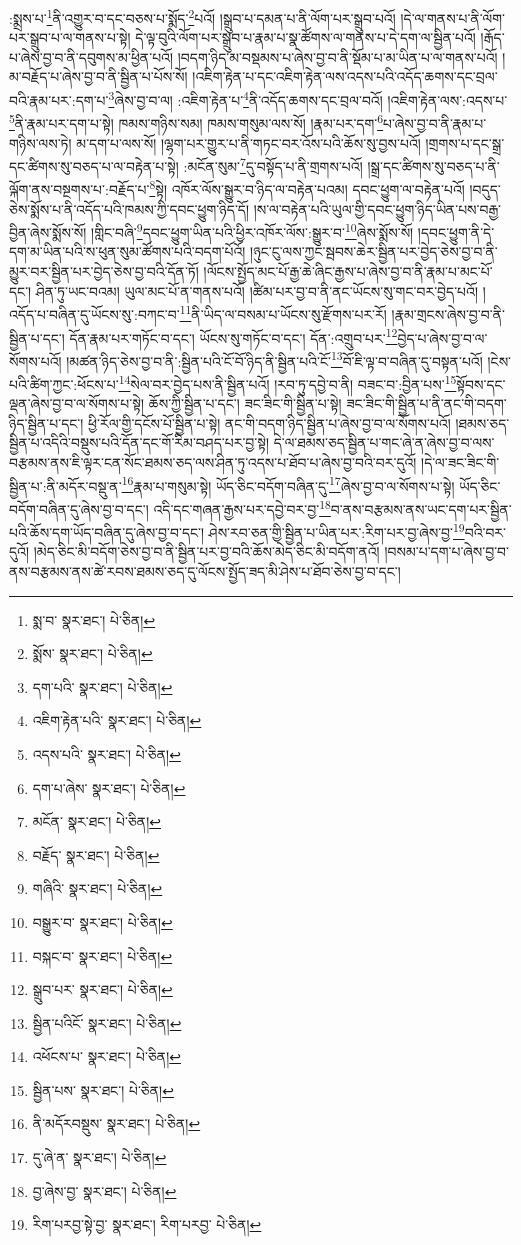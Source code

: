 :སྨྲས་པ་\footnote{སྨ་བ་  སྣར་ཐང་།  པེ་ཅིན། }ནི་འགྱུར་བ་དང་བཅས་པ་སྨོད་\footnote{སྨོས་  སྣར་ཐང་།  པེ་ཅིན། }པའོ། །སྒྲུབ་པ་དམན་པ་ནི་ལོག་པར་སྒྲུབ་པའོ། །དེ་ལ་གནས་པ་ནི་ལོག་པར་སྒྲུབ་པ་ལ་གནས་པ་སྟེ། དེ་ལྟ་བུའི་ལོག་པར་སྒྲུབ་པ་རྣམ་པ་སྣ་ཚོགས་ལ་གནས་པ་དེ་དག་ལ་སྦྱིན་པའོ། །རྒོད་པ་ཞེས་བྱ་བ་ནི་དབུགས་མ་ཕྱིན་པའོ། །བདག་ཉིད་མ་བསྡམས་པ་ཞེས་བྱ་བ་ནི་སྡོམ་པ་མ་ཡིན་པ་ལ་གནས་པའོ། །མ་བརྗོད་པ་ཞེས་བྱ་བ་ནི་སྦྱིན་པ་པོས་སོ། །འཇིག་རྟེན་པ་དང་འཇིག་རྟེན་ལས་འདས་པའི་འདོད་ཆགས་དང་བྲལ་བའི་རྣམ་པར་:དག་པ་\footnote{དག་པའི་  སྣར་ཐང་།  པེ་ཅིན། }ཞེས་བྱ་བ་ལ། :འཇིག་རྟེན་པ་\footnote{འཇིག་རྟེན་པའི་  སྣར་ཐང་།  པེ་ཅིན། }ནི་འདོད་ཆགས་དང་བྲལ་བའོ། །འཇིག་རྟེན་ལས་:འདས་པ་\footnote{འདས་པའི་  སྣར་ཐང་།  པེ་ཅིན། }ནི་རྣམ་པར་དག་པ་སྟེ། ཁམས་གཉིས་སམ། ཁམས་གསུམ་ལས་སོ། །རྣམ་པར་དག་\footnote{དག་པ་ཞེས་  སྣར་ཐང་།  པེ་ཅིན། }པ་ཞེས་བྱ་བ་ནི་རྣམ་པ་གཉིས་ལས་ཏེ། མ་དག་པ་ལས་སོ། །ལྷག་པར་གྱུར་པ་ནི་གཏང་བར་འོས་པའི་ཆོས་སུ་བྱས་པའོ། །གྲགས་པ་དང་སྒྲ་དང་ཚིགས་སུ་བཅད་པ་ལ་བརྟེན་པ་སྟེ། :མངོན་སུམ་\footnote{མངོན་  སྣར་ཐང་།  པེ་ཅིན། }དུ་བསྟོད་པ་ནི་གྲགས་པའོ། །སྒྲ་དང་ཚིགས་སུ་བཅད་པ་ནི་ལྐོག་ནས་བསྔགས་པ་:བརྗོད་པ་\footnote{བརྗོད་  སྣར་ཐང་།  པེ་ཅིན། }སྟེ། འཁོར་ལོས་སྒྱུར་བ་ཉིད་ལ་བརྟེན་པའམ། དབང་ཕྱུག་ལ་བརྟེན་པའོ། །བདུད་ཅེས་སྨོས་པ་ནི་འདོད་པའི་ཁམས་ཀྱི་དབང་ཕྱུག་ཉིད་དོ། །ས་ལ་བརྟེན་པའི་ཡུལ་གྱི་དབང་ཕྱུག་ཉིད་ཡིན་པས་བརྒྱ་བྱིན་ཞེས་སྨོས་སོ། །གླིང་བཞི་\footnote{གཞིའི་  སྣར་ཐང་།  པེ་ཅིན། }དབང་ཕྱུག་ཡིན་པའི་ཕྱིར་འཁོར་ལོས་:སྒྱུར་བ་\footnote{བསྒྱུར་བ་  སྣར་ཐང་།  པེ་ཅིན། }ཞེས་སྨོས་སོ། །དབང་ཕྱུག་ནི་དེ་དག་མ་ཡིན་པའི་ས་ཕུན་སུམ་ཚོགས་པའི་བདག་པོའོ། །ཉུང་ངུ་ལས་ཀྱང་སྦབས་ཆེར་སྦྱིན་པར་བྱེད་ཅེས་བྱ་བ་ནི་མྱུར་བར་སྦྱིན་པར་བྱེད་ཅེས་བྱ་བའི་དོན་ཏོ། །ལོངས་སྤྱོད་མང་པོ་རྒྱ་ཆེ་ཞིང་རྒྱས་པ་ཞེས་བྱ་བ་ནི་རྣམ་པ་མང་པོ་དང་། ཤིན་ཏུ་ཡང་བའམ། ཡུལ་མང་པོ་ན་གནས་པའོ། །ཚིམ་པར་བྱ་བ་ནི་ནང་ཡོངས་སུ་གང་བར་བྱེད་པའོ། །འདོད་པ་བཞིན་དུ་ཡོངས་སུ་:བཀང་བ་\footnote{བསྐང་བ་  སྣར་ཐང་།  པེ་ཅིན། }ནི་ཡིད་ལ་བསམ་པ་ཡོངས་སུ་རྫོགས་པར་རོ། །རྣམ་གྲངས་ཞེས་བྱ་བ་ནི་སྦྱིན་པ་དང་། དོན་རྣམ་པར་གཏོང་བ་དང་། ཡོངས་སུ་གཏོང་བ་དང་། དོན་:འགྲུབ་པར་\footnote{སྒྲུབ་པར་  སྣར་ཐང་།  པེ་ཅིན། }བྱེད་པ་ཞེས་བྱ་བ་ལ་སོགས་པའོ། །མཚན་ཉིད་ཅེས་བྱ་བ་ནི་:སྦྱིན་པའི་ངོ་བོ་ཉིད་ནི་སྦྱིན་པའི་ངོ་\footnote{སྦྱིན་པའིངོ་  སྣར་ཐང་།  པེ་ཅིན། }བོ་ཇི་ལྟ་བ་བཞིན་དུ་བསྟན་པའོ། །ངེས་པའི་ཚིག་ཀྱང་:ཕོངས་པ་\footnote{འཕོངས་པ་  སྣར་ཐང་།  པེ་ཅིན། }སེལ་བར་བྱེད་པས་ནི་སྦྱིན་པའོ། །རབ་ཏུ་དབྱེ་བ་ནི། བཟང་བ་:བྱིན་པས་\footnote{སྦྱིན་པས་  སྣར་ཐང་།  པེ་ཅིན། }སྟོབས་དང་ལྡན་ཞེས་བྱ་བ་ལ་སོགས་པ་སྟེ། ཆོས་ཀྱི་སྦྱིན་པ་དང་། ཟང་ཟིང་གི་སྦྱིན་པ་སྟེ། ཟང་ཟིང་གི་སྦྱིན་པ་ནི་ནང་གི་བདག་ཉིད་སྦྱིན་པ་དང་། ཕྱི་རོལ་གྱི་དངོས་པོ་སྦྱིན་པ་སྟེ། ནང་གི་བདག་ཉིད་སྦྱིན་པ་ཞེས་བྱ་བ་ལ་སོགས་པའོ། །ཐམས་ཅད་སྦྱིན་པ་འདིའི་བསྡུས་པའི་དོན་དང་གོ་རིམ་བཤད་པར་བྱ་སྟེ། དེ་ལ་ཐམས་ཅད་སྦྱིན་པ་གང་ཞེ་ན་ཞེས་བྱ་བ་ལས་བརྩམས་ནས་ཇི་ལྟར་ངན་སོང་ཐམས་ཅད་ལས་ཤིན་ཏུ་འདས་པ་ཐོབ་པ་ཞེས་བྱ་བའི་བར་དུའོ། །དེ་ལ་ཟང་ཟིང་གི་སྦྱིན་པ་:ནི་མདོར་བསྡུ་ན་\footnote{ནི་མདོརབསྡུས་  སྣར་ཐང་།  པེ་ཅིན། }རྣམ་པ་གསུམ་སྟེ། ཡོད་ཅིང་བདོག་བཞིན་དུ་\footnote{དུ་ཞེ་ན་  སྣར་ཐང་།  པེ་ཅིན། }ཞེས་བྱ་བ་ལ་སོགས་པ་སྟེ། ཡོད་ཅིང་བདོག་བཞིན་དུ་ཞེས་བྱ་བ་དང་། འདི་དང་གཞན་རྒྱས་པར་དབྱེ་བར་བྱ་\footnote{བྱ་ཞེས་བྱ་  སྣར་ཐང་།  པེ་ཅིན། }བ་ནས་བརྩམས་ནས་ཡང་དག་པར་སྦྱིན་པའི་ཆོས་དག་ཡོད་བཞིན་དུ་ཞེས་བྱ་བ་དང་། ཤེས་རབ་ཅན་གྱི་སྦྱིན་པ་ཡིན་པར་:རིག་པར་བྱ་ཞེས་བྱ་\footnote{རིག་པརབྱ་སྟེ་བྱ་  སྣར་ཐང་། རིག་པརབྱ་  པེ་ཅིན། }བའི་བར་དུའོ། །མེད་ཅིང་མི་བདོག་ཅེས་བྱ་བ་ནི་སྦྱིན་པར་བྱ་བའི་ཆོས་མེད་ཅིང་མི་བདོག་ནའོ། །བསམ་པ་དག་པ་ཞེས་བྱ་བ་ནས་བརྩམས་ནས་ཚེ་རབས་ཐམས་ཅད་དུ་ལོངས་སྤྱོད་ཟད་མི་ཤེས་པ་ཐོབ་ཅེས་བྱ་བ་དང་། 